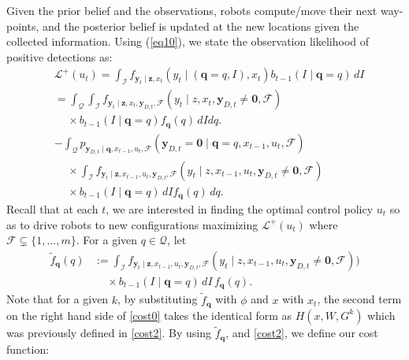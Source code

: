 \documentclass[letterpaper, 10 pt, conference]{ieeeconf}
\begin{document}
Given the prior belief and the observations, robots compute/move their next way-points, and the posterior belief is updated at the new locations given the collected information.
Using (\ref{eq10}), we state the observation likelihood of positive detections as:
\begin{align}
&\mathcal{L}^{+}(u_t) =\int_{\mathcal{I}} f_{\bm{y}_{t} \mid \bm{z},x_t}(y_{t}\mid (\bm{q}=q,I),x_t)b_{t-1}(I \mid \bm{q} =q)\,dI \nonumber  \\
&=\int_{\mathcal{Q}}\int_{\mathcal{I}} f_{\bm{y}_t \mid \bm{z},x_t,\bm{y}_{D,t},\mathcal{F}}(y_t \mid z,x_t,\bm{y}_{D,t}\neq \mathbf{0},\mathcal{F}) \nonumber  \nonumber \\
&\,\,\,\,\,\,\,\times b_{t-1}(I \mid \bm{q} =q)f_{\bm{q}}(q)\,dIdq.\nonumber  \nonumber \\
&-\int_{\mathcal{Q}}p_{\bm{y}_{D,t} \mid \bm{q},x_{t-1},u_t,\mathcal{F}}(\bm{y}_{D,t} = \mathbf{0} \mid \bm{q}=q,x_{t-1},u_t,\mathcal{F})  \nonumber \\
&\,\,\,\,\,\,\,\times \int_{\mathcal{I}}f_{\bm{y}_t \mid \bm{z},x_{t-1},u_t,\bm{y}_{D,t},\mathcal{F}}(y_t \mid z,x_{t-1},u_t,\bm{y}_{D,t}\neq \mathbf{0},\mathcal{F})  \nonumber \\
&\,\,\,\,\,\,\,\times b_{t-1}(I \mid \bm{q} =q)\,dIf_{\bm{q}}(q)\,dq.
\label{cost0}
\end{align}
Recall that at each $t$, we are interested in finding the optimal control policy $u_t$ so as to drive robots to new configurations maximizing $\mathcal{L}^+(u_t)$ where $\mathcal{F} \subsetneq \lbrace 1,\dots,m \rbrace$. 
For a given $q \in \mathcal{Q}$, let
\begin{align*}
\widetilde{f}_{\bm{q}}(q) &:= \int_{\mathcal{I}}f_{\bm{y}_t \mid \bm{z},x_{t-1},u_t,\bm{y}_{D,t},\mathcal{F}}(y_t \mid z,x_{t-1},u_t,\bm{y}_{D,t}\neq \mathbf{0},\mathcal{F})) \\
&\,\,\,\,\,\,\,\times b_{t-1}(I \mid \bm{q} =q)\,dI\,f_{\bm{q}}(q).
\end{align*}
Note that for a given $k$, by substituting $\widetilde{f}_{\bm{q}}$ with $\phi$ and $x$ with $x_t$, the second term on the right hand side of \eqref{cost0} takes the identical form as $H(x,W,G^k)$ which was previously defined in \eqref{cost2}. By using $\widetilde{f}_{\bm{q}}$, and \eqref{cost2}, we define our cost function:
\end{document}
